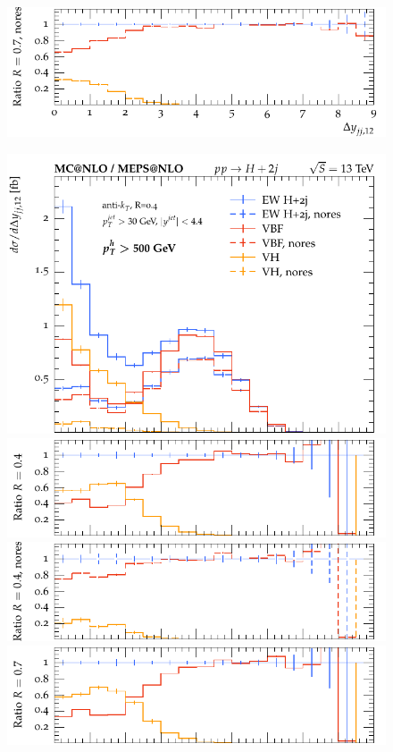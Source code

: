 \documentclass[10pt,prd,fleqn,superscriptaddress,notitlepage,nofootinbib,preprintnumbers,nobalancelastpage]{revtex4-1}
\begin{document}
\begin{figure}[p]
\begin{minipage}{0.28\textwidth}
    \includegraphics[width=\textwidth]{figures/vbfvh/nores-pt200-ratio4.pdf}
    \end{minipage}\hfill
    \begin{minipage}{0.28\textwidth}
     \includegraphics[width=\textwidth]{figures/vbfvh/nores-pt500-main.pdf}
     \includegraphics[width=\textwidth]{figures/vbfvh/nores-pt500-ratio1.pdf}
    \includegraphics[width=\textwidth]{figures/vbfvh/nores-pt500-ratio2.pdf}
    \includegraphics[width=\textwidth]{figures/vbfvh/nores-pt500-ratio3.pdf}

\end{minipage}
\end{figure}
\end{document}
